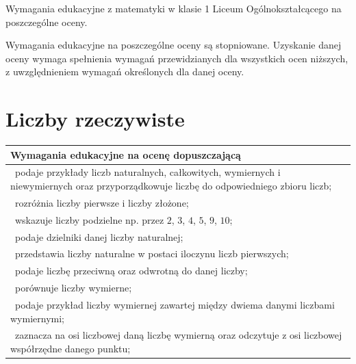 \documentclass[12pt,a4paper]{article}
\begin{document}
	
	\begin{center}
		\Large Wymagania edukacyjne z matematyki w klasie 1 Liceum Ogólnokształcącego na poszczególne oceny.
	\end{center}
	
	Wymagania edukacyjne na poszczególne oceny są stopniowane.
	Uzyskanie danej oceny wymaga spełnienia wymagań przewidzianych
	dla wszystkich ocen niższych, z uwzględnieniem wymagań
	określonych dla danej oceny.
	
	\section{Liczby rzeczywiste}
	
	\begin{longtable}{|p{16cm}|}
		\hline
		\textbf{Wymagania edukacyjne na ocenę dopuszczającą} \\ \hline
		
		\endfirsthead
		
		\endhead
		
		\textbullet\ podaje przykłady liczb naturalnych, całkowitych, wymiernych i niewymiernych oraz przyporządkowuje liczbę do odpowiedniego zbioru liczb; \\
		
		\textbullet\ rozróżnia liczby pierwsze i liczby złożone; \\
		
		\textbullet\ wskazuje liczby podzielne np. przez $2$, $3$, $4$, $5$, $9$, $10$; \\
		
		\textbullet\ podaje dzielniki danej liczby naturalnej; \\
		
		\textbullet\ przedstawia liczby naturalne w postaci iloczynu liczb pierwszych; \\
		
		\textbullet\ podaje liczbę przeciwną oraz odwrotną do danej liczby; \\
		
		\textbullet\ porównuje liczby wymierne; \\
		
		\textbullet\ podaje przykład liczby wymiernej zawartej między dwiema danymi liczbami wymiernymi; \\
		
		\textbullet\ zaznacza na osi liczbowej daną liczbę wymierną oraz odczytuje z osi liczbowej współrzędne danego punktu; \\
		

\end{longtable}
\end{document}
